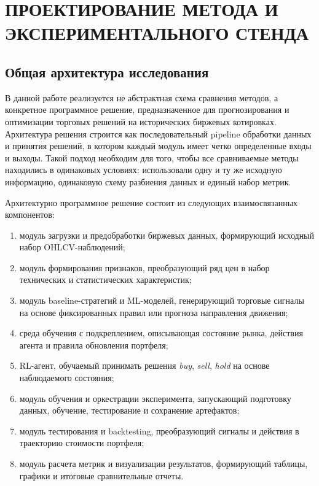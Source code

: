 \clearpage
\section{ПРОЕКТИРОВАНИЕ МЕТОДА И ЭКСПЕРИМЕНТАЛЬНОГО СТЕНДА}

\subsection{Общая архитектура исследования}

В данной работе реализуется не абстрактная схема сравнения методов, а конкретное программное решение, предназначенное для прогнозирования и оптимизации торговых решений на исторических биржевых котировках. Архитектура решения строится как последовательный pipeline обработки данных и принятия решений, в котором каждый модуль имеет четко определенные входы и выходы. Такой подход необходим для того, чтобы все сравниваемые методы находились в одинаковых условиях: использовали одну и ту же исходную информацию, одинаковую схему разбиения данных и единый набор метрик.

Архитектурно программное решение состоит из следующих взаимосвязанных компонентов:
\begin{enumerate}[leftmargin=1.25cm,label=\arabic*)]
\item модуль загрузки и предобработки биржевых данных, формирующий исходный набор OHLCV-наблюдений;
\item модуль формирования признаков, преобразующий ряд цен в набор технических и статистических характеристик;
\item модуль baseline-стратегий и ML-моделей, генерирующий торговые сигналы на основе фиксированных правил или прогноза направления движения;
\item среда обучения с подкреплением, описывающая состояние рынка, действия агента и правила обновления портфеля;
\item RL-агент, обучаемый принимать решения \textit{buy}, \textit{sell}, \textit{hold} на основе наблюдаемого состояния;
\item модуль обучения и оркестрации эксперимента, запускающий подготовку данных, обучение, тестирование и сохранение артефактов;
\item модуль тестирования и backtesting, преобразующий сигналы и действия в траекторию стоимости портфеля;
\item модуль расчета метрик и визуализации результатов, формирующий таблицы, графики и итоговые сравнительные отчеты.
\end{enumerate}

